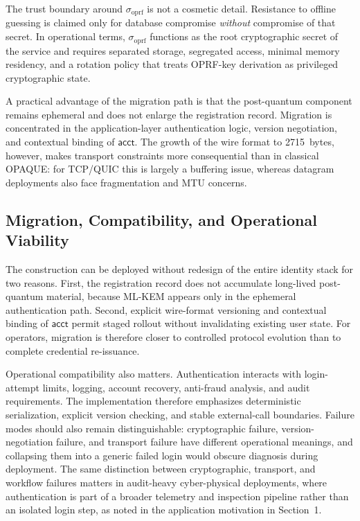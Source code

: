 \documentclass[preprint,12pt]{elsarticle}
\newcommand{\acct}{\mathsf{acct}}
\newcommand{\sigoprf}{\sigma_{\mathrm{oprf}}}
\theoremstyle{remark}
\begin{document}
The trust boundary around $\sigoprf$ is not a cosmetic detail. Resistance
to offline guessing is claimed only for database compromise
\emph{without} compromise of that secret. In operational terms,
$\sigoprf$ functions as the root cryptographic secret of the service and
requires separated storage, segregated access, minimal memory residency,
and a rotation policy that treats OPRF-key derivation as privileged
cryptographic state.

A practical advantage of the migration path is that the
post-quantum component remains ephemeral and does not enlarge the
registration record. Migration is concentrated in the application-layer
authentication logic, version negotiation, and contextual binding of
$\acct$. The growth of the wire format to 2715~bytes, however, makes
transport constraints more consequential than in classical OPAQUE: for
TCP/QUIC this is largely a buffering issue, whereas datagram
deployments also face fragmentation and MTU concerns.

\subsection{Migration, Compatibility, and Operational Viability}

The construction can be deployed without redesign of the entire
identity stack for two reasons. First, the registration record does not
accumulate long-lived post-quantum material, because ML-KEM appears
only in the ephemeral authentication path. Second, explicit wire-format
versioning and contextual binding of $\acct$ permit staged rollout
without invalidating existing user state. For operators, migration is
therefore closer to controlled protocol evolution than to complete
credential re-issuance.

Operational compatibility also matters.
Authentication interacts with login-attempt limits, logging, account
recovery, anti-fraud analysis, and audit requirements. The
implementation therefore emphasizes deterministic serialization,
explicit version checking, and stable external-call boundaries. Failure modes
should also remain distinguishable: cryptographic failure,
version-negotiation failure, and transport failure have different
operational meanings, and collapsing them into a generic failed login
would obscure diagnosis during deployment.
The same distinction between cryptographic, transport, and workflow
failures matters in audit-heavy cyber-physical deployments, where
authentication is part of a broader telemetry and inspection pipeline
rather than an isolated login step, as noted in the application
motivation in Section~1.
\end{document}
